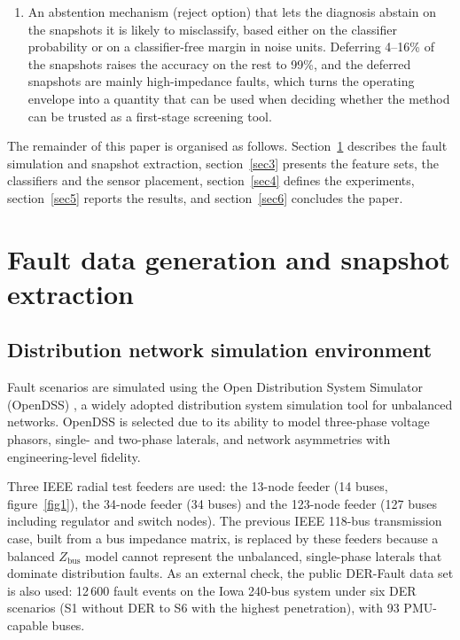 \documentclass[11pt]{article}
\newenvironment{nw}{}{}
\begin{document}
\begin{nw}
\begin{enumerate}
\item An abstention mechanism (reject option) that lets the diagnosis abstain on the snapshots it is likely to misclassify, based either on the classifier probability or on a classifier-free margin in noise units. Deferring 4--16\% of the snapshots raises the accuracy on the rest to 99\%, and the deferred snapshots are mainly high-impedance faults, which turns the operating envelope into a quantity that can be used when deciding whether the method can be trusted as a first-stage screening tool.
\end{enumerate}

The remainder of this paper is organised as follows. Section~\ref{sec2} describes the fault simulation and snapshot extraction, section~\ref{sec3} presents the feature sets, the classifiers and the sensor placement, section~\ref{sec4} defines the experiments, section~\ref{sec5} reports the results, and section~\ref{sec6} concludes the paper.
\end{nw}


\section{Fault data generation and snapshot extraction}\label{sec2}

\subsection{Distribution network simulation environment}\label{subsec2_1}

\begin{nw}
Fault scenarios are simulated using the Open Distribution System Simulator (OpenDSS) \cite{dugan2011}, a widely adopted distribution system simulation tool for unbalanced networks. OpenDSS is selected due to its ability to model three-phase voltage phasors, single- and two-phase laterals, and network asymmetries with engineering-level fidelity.

Three IEEE radial test feeders are used: the 13-node feeder (14 buses, figure~\ref{fig1}), the 34-node feeder (34 buses) and the 123-node feeder (127 buses including regulator and switch nodes). The previous IEEE 118-bus transmission case, built from a bus impedance matrix, is replaced by these feeders because a balanced $Z_{\mathrm{bus}}$ model cannot represent the unbalanced, single-phase laterals that dominate distribution faults. As an external check, the public DER-Fault data set \cite{derfault} is also used: 12\,600 fault events on the Iowa 240-bus system under six DER scenarios (S1 without DER to S6 with the highest penetration), with 93 PMU-capable buses.
\end{nw}
\end{document}
